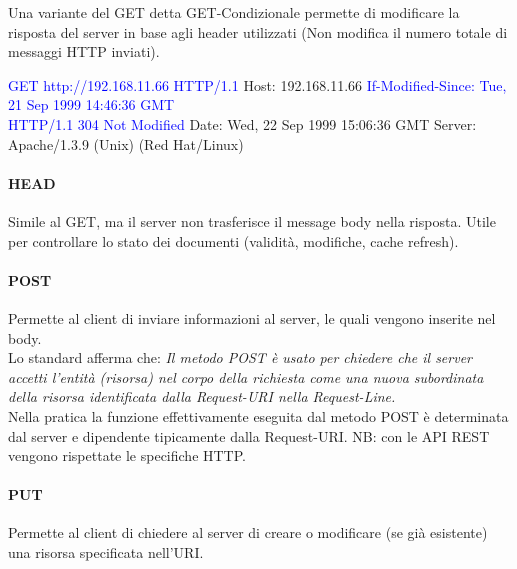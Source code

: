 \newpage
Una variante del GET detta GET-Condizionale permette di modificare la risposta del server in base agli header utilizzati (Non modifica il numero totale di messaggi HTTP inviati).
\begin{mdframed}
    \textcolor{blue}{GET http://192.168.11.66 HTTP/1.1}\newline
    Host: 192.168.11.66\newline
    \textcolor{blue}{If-Modified-Since: Tue, 21 Sep 1999 14:46:36 GMT}\newline
    \\
    \textcolor{blue}{HTTP/1.1 304 Not Modified}\newline
    Date: Wed, 22 Sep 1999 15:06:36 GMT\newline
    Server: Apache/1.3.9 (Unix) (Red Hat/Linux)\newline
\end{mdframed}

\paragraph{HEAD}
Simile al GET, ma il server non trasferisce il message body nella risposta.
Utile per controllare lo stato dei documenti (validità, modifiche, cache refresh).

\paragraph{POST} Permette al client di inviare informazioni al server, le quali vengono inserite nel body.\newline
\\
Lo standard afferma che:\newline
\emph{Il metodo POST è usato per chiedere che il server accetti l’entità (risorsa)
nel corpo della richiesta come una nuova subordinata della risorsa
identificata dalla Request-URI nella Request-Line.}
\\
\newline
Nella pratica la funzione effettivamente eseguita dal metodo POST è determinata dal server e dipendente tipicamente dalla Request-URI.
\newline
NB: con le API REST vengono rispettate le specifiche HTTP.

\paragraph{PUT} Permette al client di chiedere al server di creare o modificare (se già esistente) una risorsa specificata nell'URI.

